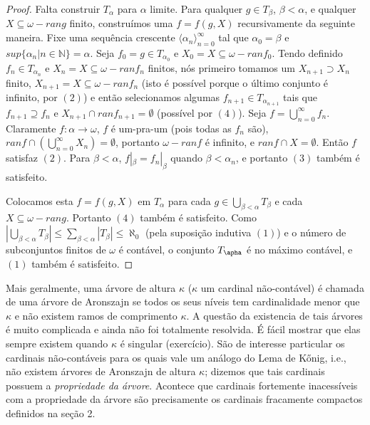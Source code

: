 \documentclass[a4paper]{article}
\theoremstyle{plain}\newtheorem{teo}{Teorema}[section]
\theoremstyle{plain}\newtheorem{prop}[teo]{Proposição}
\theoremstyle{plain}\newtheorem{lem}[teo]{Lema}
\theoremstyle{plain}\newtheorem{cor}[teo]{Corolário}
\theoremstyle{definition}\newtheorem{defi}[teo]{Definição}
\theoremstyle{remark}\newtheorem{rem}[teo]{Observação}
\theoremstyle{definition}\newtheorem{example}[teo]{Exemplo}
\theoremstyle{remark}\newtheorem{step}{\bf Step}
\begin{document}
\begin{proof}
  Falta construir $T_{\alpha}$ para $\alpha$ limite. Para qualquer $g \in T_{\beta}$, $\beta < \alpha$, e qualquer $X \subseteq \omega - rang$ finito, construímos uma $f = f(g, X)$ recursivamente da seguinte maneira. Fixe uma sequência crescente $\langle \alpha_n \rangle_{n=0}^{\infty}$ tal que $\alpha_0 = \beta$ e $sup\{\alpha_n | n \in \mathbb{N}\} = \alpha$. Seja $f_0 = g \in T_{\alpha_0}$ e $X_0 = X \subseteq \omega - ranf_0$. Tendo definido $f_n \in T_{\alpha_n}$ e $X_n = X \subseteq \omega - ranf_n$ finitos, nós primeiro tomamos um $X_{n+1} \supset X_n$ finito, $X_{n+1} = X \subseteq \omega - ranf_n$ (isto é possível porque o último conjunto é infinito, por $(2)$) e então selecionamos algumas $f_{n+1} \in T_{\alpha_{n+1}}$ tais que $f_{n+1} \supseteq f_n$ e $X_{n+1} \cap ranf_{n+1} = \emptyset$ (possível por $(4)$). Seja $f = \bigcup_{n = 0}^{\infty}f_n$. Claramente $f: \alpha \rightarrow \omega$, $f$ é um-pra-um (pois todas as $f_n$ são), $ranf \cap (\bigcup_{n = 0}^{\infty} X_n) = \emptyset$, portanto $\omega - ranf$ é infinito, e $ranf \cap X = \emptyset$. Então $f$ satisfaz $(2)$. Para $\beta < \alpha$, $f |_{\beta} = f_{n} |_{\beta}$ quando $\beta < \alpha_n$, e portanto $(3)$ também é satisfeito.
  
  Colocamos esta $f = f(g, X)$ em $T_{\alpha}$ para cada $g \in \bigcup_{\beta < \alpha} T_{\beta}$ e cada $X \subseteq \omega - rang$. Portanto $(4)$ também é satisfeito. Como $|\bigcup_{\beta<\alpha}T_{\beta}| \le \sum_{\beta<\alpha}|T_{\beta}| \le \aleph_0$ (pela suposição indutiva $(1)$) e o número de subconjuntos finitos de $\omega$ é contável, o conjunto $T_{\apha}$ é no máximo contável, e $(1)$ também é satisfeito.
\end{proof}

Mais geralmente, uma árvore de altura $\kappa$ ($\kappa$ um cardinal não-contável) é chamada de uma árvore de Aronszajn se todos os seus níveis tem cardinalidade menor que $\kappa$ e não existem ramos de comprimento $\kappa$. A questão da existencia de tais árvores é muito complicada e ainda não foi totalmente resolvida. É fácil mostrar que elas sempre existem quando $\kappa$ é singular (exercício). São de interesse particular os cardinais não-contáveis para os quais vale um análogo do Lema de Kőnig, i.e., não existem árvores de Aronszajn de altura $\kappa$; dizemos que tais cardinais possuem a \textit{propriedade da árvore}. Acontece que cardinais fortemente inacessíveis com a propriedade da árvore são precisamente os cardinais fracamente compactos definidos na seção 2.
  
  
  
\end{document}
